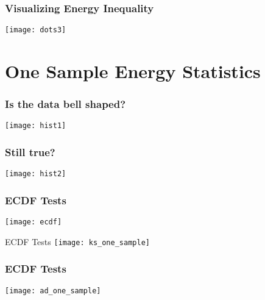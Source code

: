 \documentclass[presentation]{beamer}
\begin{document}
\begin{frame}
  \frametitle{Visualizing Energy Inequality}
  \begin{center}
    \texttt{[image: dots3]}
  \end{center}
\end{frame}


\section{One Sample Energy Statistics}

\begin{frame}
  \frametitle{Is the data bell shaped?}
  \texttt{[image: hist1]}
\end{frame}

\begin{frame}
  \frametitle{Still true?}
  \texttt{[image: hist2]} 
\end{frame}

\begin{frame}
  \frametitle{ECDF Tests}
\texttt{[image: ecdf]}
\end{frame}

\begin{frame}{ECDF Tests}
\texttt{[image: ks\_one\_sample]}
\end{frame}

\begin{frame}
  \frametitle{ECDF Tests}
\texttt{[image: ad\_one\_sample]}  
\end{frame}

\end{document}

